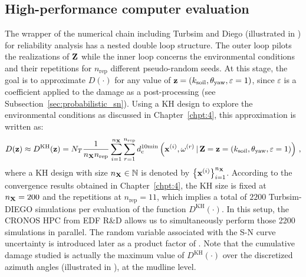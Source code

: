 \subsection{High-performance computer evaluation}
The wrapper of the numerical chain including Turbsim and Diego (illustrated in ) for reliability analysis has a nested double loop structure. 
The outer loop pilots the realizations of ${\bf Z}$ while the inner loop concerns the environmental conditions and their repetitions for $n_{\mathrm{rep}}$ different pseudo-random seeds. 
At this stage, the goal is to approximate $D(\cdot)$ for any value of ${\bf z} = (k_{\mathrm{soil}}, \theta_{\mathrm{yaw}}, \varepsilon=1)$, since $\varepsilon$ is a coefficient applied to the damage as a post-processing (see Subsection~\ref{sec:probabilistic_sn}). 
Using a KH design to explore the environmental conditions as discussed in Chapter~\ref{chpt:4}, this approximation is written as: 
\begin{equation}
    D({\bf z}) \approx D^{\mathrm{KH}}({\bf z}) = N_T \frac{1}{n_{\bf X} n_{\mathrm{rep}}} \sum_{i=1}^{n_{\bf X}} \sum_{r=1}^{n_{\mathrm{rep}}} d_{\mathrm{c}}^{10\mathrm{min}}\left({\bf x}^{(i)}, \omega^{(r)} \,|\, {\bf Z} = {\bf z} = (k_{\mathrm{soil}}, \theta_{\mathrm{yaw}}, \varepsilon=1)\right)\, ,
    \label{eq:hpc_cumulated_damage}
\end{equation}
where a KH design with size $n_{\bf X} \in \mathbb{N}$ is denoted by $\left\{{\bf x}^{(i)}\right\}_{i=1}^{n_{\bf X}}$. 
According to the convergence results obtained in Chapter~\ref{chpt:4}, the KH size is fixed at $n_{\bf X}=200$ and the repetitions at $n_{\mathrm{rep}}=11$, which implies a total of $2200$ Turbsim-DIEGO simulations per evaluation of the function $D^{\mathrm{KH}}(\cdot)$. 
In this setup, the CRONOS HPC from EDF R\&D allows us to simultaneously perform those 2200 simulations in parallel. 
The random variable associated with the S-N curve uncertainty is introduced later as a product factor of . 
Note that the cumulative damage studied is actually the maximum value of $D^{\mathrm{KH}}(\cdot)$ over the discretized azimuth angles (illustrated in ), at the mudline level. 


